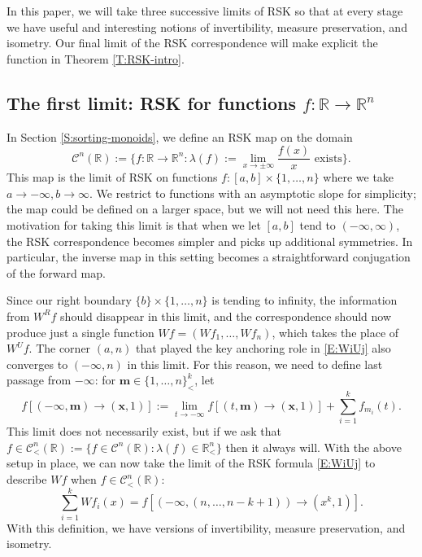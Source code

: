\documentclass[11pt]{article}
\newcommand{\R}{\mathbb{R}}
\newcommand{\la}{\lambda}
\newcommand{\cC}{\mathcal{C}}
\newcommand{\X}{\times}
\newcommand{\bx}{\mathbf{x}}
\newcommand{\bm}{\mathbf{m}}
\theoremstyle{definition} %
\theoremstyle{remark} %
\begin{document}
In this paper, we will take three successive limits of RSK so that at every stage we have useful and interesting notions of invertibility, measure preservation, and isometry. Our final limit of the RSK correspondence will make explicit the function in Theorem \ref{T:RSK-intro}.

\subsection{The first limit: RSK for functions \texorpdfstring{$f:\R \to \R^n$}{f: R to Rn}}
\label{SS:RSK-1}
In Section \ref{S:sorting-monoids}, we define an RSK map on the domain
$$
\cC^n(\R) := \{f:\R \to \R^n: \la(f) := \lim_{x \to \pm \infty} \frac{f(x)}{x} \text{ exists}\}.
$$
This map is the limit of RSK on functions $f:[a, b] \X \{1, \dots, n\}$ where we take $a \to -\infty, b \to \infty$. We restrict to functions with an asymptotic slope for simplicity; the map could be defined on a larger space, but we will not need this here. The motivation for taking this limit is that when we let $[a, b]$ tend to $(-\infty, \infty)$, the RSK correspondence becomes simpler and picks up additional symmetries. In particular, the inverse map in this setting becomes a straightforward conjugation of the forward map.

 Since our right boundary $\{b\} \times \{1, \dots, n\}$ is tending to infinity, the information from $W^R f$ should disappear in this limit, and the correspondence should now produce just a single function $W f = (W f_1, \dots, Wf_n)$, which takes the place of $W^U f$. 
The corner $(a, n)$ that played the key anchoring role in \eqref{E:WiUj} also converges to $(-\infty, n)$ in this limit. For this reason, we need to define last passage from $-\infty$: for $\bm \in \{1, \dots, n\}^k_<$, let
\begin{equation}
	\label{E:finftyM}
f[(-\infty, \bm) \to (\bx, 1)] := \lim_{t \to -\infty} f[(t, \bm) \to (\bx, 1)] + \sum_{i=1}^k f_{m_i}(t).
\end{equation}
This limit does not necessarily exist, but if we ask that $f \in \cC^n_<(\R) := \{f \in \cC^n(\R) : \la(f) \in \R^n_<\}$ then it always will. With the above setup in place, we can now take the limit of the RSK formula \eqref{E:WiUj} to describe $Wf$ when $f \in \cC^n_<(\R)$:
\begin{equation}
\label{E:Wff}
\sum_{i=1}^k Wf_i(x) = f[(-\infty, (n, \dots, n - k + 1)) \to (x^k, 1)].
\end{equation}
With this definition, we have versions of invertibility, measure preservation, and isometry.
 
\end{document}
